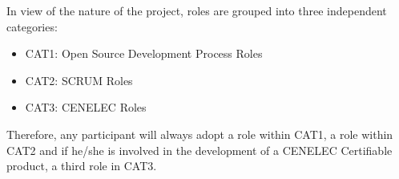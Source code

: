 \documentclass{template/openetcs_article}
\begin{document}



In view of the nature of the project, roles are grouped into three independent categories:

\begin{itemize}
\item CAT1: Open Source Development Process Roles
\item CAT2: SCRUM Roles
\item CAT3: CENELEC Roles 
\end{itemize}

Therefore, any participant will always adopt a role within CAT1, a role within CAT2 and if he/she is involved in the development of a CENELEC Certifiable product, a third role in CAT3.
\end{document}
